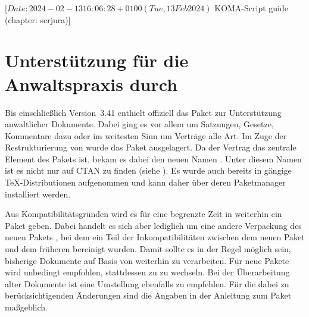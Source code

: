 %
%
%
%
%
%
%

%
                 [$Date: 2024-02-13 16:06:28 +0100 (Tue, 13 Feb 2024) $
                  KOMA-Script guide (chapter: scrjura)]

\chapter{Unterstützung für die Anwaltspraxis durch }
\BeginIndexGroup
{}

Bis einschließlich Version~3.41 enthielt \KOMAScript{} offiziell das Paket
 zur Unterstützung anwaltlicher Dokumente. Dabei ging es vor
allem um Satzungen, Gesetze, Kommentare dazu oder im weitesten Sinn um
Verträge alle Art. Im Zuge der Restrukturierung von \KOMAScript{} wurde das
Paket ausgelagert. Da der Vertrag das zentrale Element des Pakets ist, bekam
es dabei den neuen Namen . Unter diesem Namen ist es nicht
nur auf CTAN zu finden (siehe \cite{package:contract}). Es wurde auch bereits in
gängige \TeX-Distributionen aufgenommen und kann daher über deren Paketmanager
installiert werden.

Aus Kompatibilitätsgründen wird es für eine begrenzte Zeit in \KOMAScript{}
weiterhin ein Paket  geben. Dabei handelt es sich aber
lediglich um eine andere Verpackung des neuen Pakets , bei
dem ein Teil der Inkompatibilitäten zwischen dem neuen Paket und dem früheren
 bereinigt wurden. Damit sollte es in der Regel möglich sein,
bisherige Dokumente auf Basis von  weiterhin zu
verarbeiten. Für neue Pakete wird unbedingt empfohlen, stattdessen zu
 zu wechseln. Bei der Überarbeitung alter Dokumente ist eine
Umstellung ebenfalls zu empfehlen. Für die dabei zu berücksichtigenden
Änderungen sind die Angaben in der Anleitung zum Paket 
maßgeblich.

